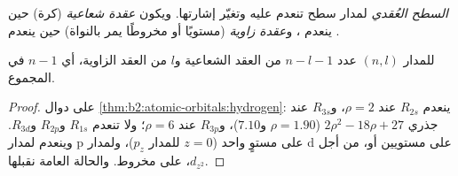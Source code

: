 \begin{definition}[العُقد]\label{def:b2:atomic-orbitals:node}
\emph{السطح العُقدي} لمدار سطح تنعدم عليه
 وتغيّر إشارتها. ويكون \emph{عقدة شعاعية}
(كرة) حين ينعدم ، و\emph{عقدة
زاوية} (مستويًا أو مخروطًا يمر بالنواة) حين ينعدم
.
\end{definition}

\begin{proposition}[عدّ العقد]\label{prop:b2:atomic-orbitals:nodes}
للمدار $(n, l)$ عدد $n - l - 1$ من العقد الشعاعية و$l$ من العقد الزاوية، أي $n - 1$ في
المجموع.
\end{proposition}

\begin{proof}
على دوال \cref{thm:b2:atomic-orbitals:hydrogen}: ينعدم $R_{2s}$ عند
$\rho = 2$، و$R_{3s}$ عند جذري $2\rho^2 - 18\rho + 27$ ($\rho = 1.90$ و$7.10$)،
و$R_{3p}$ عند $\rho = 6$؛ ولا تنعدم $R_{1s}$ و$R_{2p}$ و$R_{3d}$. وينعدم 
لمدار p على مستوٍ واحد ($z = 0$ للمدار $p_z$)، ولمدار d على مستويين
أو، من أجل $d_{z^2}$، على مخروط. والحالة العامة نقبلها.
\end{proof}

